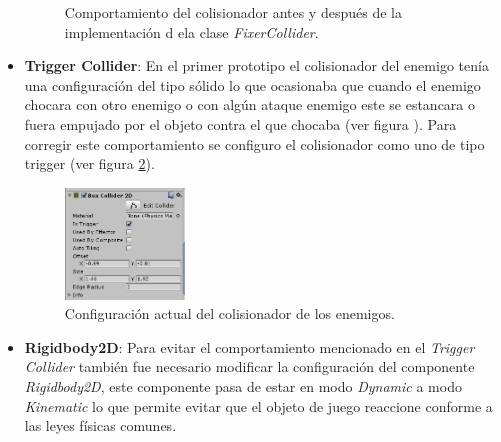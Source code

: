 \begin{itemize}
\begin{figure}[h]
	 	
			
	  		\caption{Comportamiento del colisionador antes y después de la implementación d ela clase \textit{FixerCollider}.}
	  		\label{fig:FixerCollider}
		\end{figure} 
		 
		 \item \textbf{Trigger Collider}: En el primer prototipo el colisionador del 
		 enemigo tenía una configuración del tipo sólido lo que ocasionaba que cuando 
		 el enemigo chocara con otro enemigo o con algún ataque enemigo este se 
		 estancara o fuera empujado por el objeto contra el que chocaba (ver figura ). 
		 Para corregir este comportamiento se configuro el colisionador como uno de tipo 
		 trigger (ver figura \ref{fig:EnemyColliderTri}).  
			
			\begin{figure}[h]
    			\centering
    			\includegraphics[width=0.3\textwidth]{03TrabajoRealizado/imagenes/Colisonador01.png}
    			\caption{Configuración actual del colisionador de los enemigos.}
    			\label{fig:EnemyColliderTri}
			\end{figure}	
		
		 \item \textbf{Rigidbody2D}: Para evitar el comportamiento mencionado en el 
		 \textit{Trigger Collider} también fue necesario modificar la configuración 
		 del componente \textit{Rigidbody2D}, este componente pasa de estar en modo 
		 \textit{Dynamic} a modo \textit{Kinematic} lo que permite evitar que el objeto 
		 de juego reaccione conforme a las leyes físicas comunes.   
		 	

\end{itemize}
